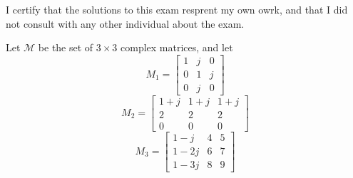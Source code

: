 \documentclass{exam}
\begin{document}
  I certify that the solutions to this exam resprent my own owrk, and that I did not consult with any other individual about the exam.
  \vspace*{50px}
  \begin{problem}
    Let $\mathcal{M}$ be the set of $3 \times 3$ complex matrices, and let
    \[
      M_1 = 
      \begin{bmatrix}
        1 & j & 0 \\
        0 & 1 & j \\
        0 & j & 0 
      \end{bmatrix}
    \]
    \[
      M_2 = 
      \begin{bmatrix}
        1 + j & 1 + j & 1 + j \\
        2 & 2 & 2 \\
        0 & 0 & 0
      \end{bmatrix}
    \]
    \[
      M_3 = 
      \begin{bmatrix}
        1 - j & 4 & 5 \\
        1 - 2j & 6 & 7 \\
        1 - 3j & 8 & 9
      \end{bmatrix}
    \]
  \end{problem}
\end{document}
